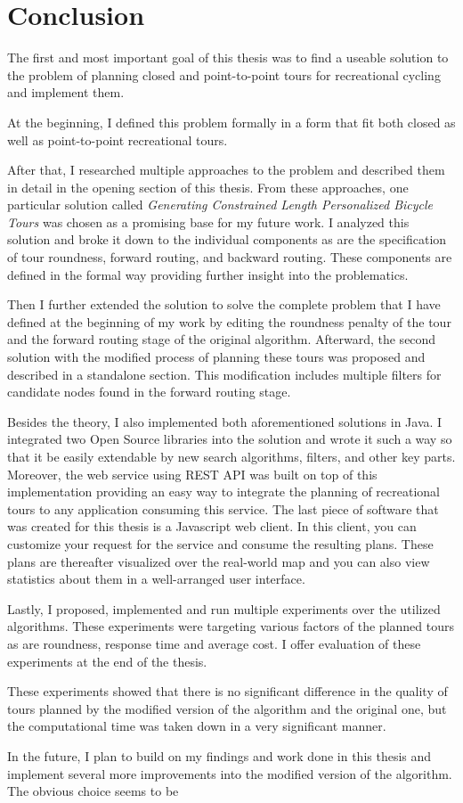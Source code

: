 \documentclass{ctuthesis}
\begin{document}
\chapter{Conclusion}
The first and most important goal of this thesis was to find a useable solution to the problem of planning closed and point-to-point tours for recreational cycling and implement them. \par At the beginning, I defined this problem formally in a form that fit both closed as well as point-to-point recreational tours.\par After that, I researched multiple approaches to the problem and described them in detail in the opening section of this thesis. From these approaches, one particular solution called \emph{Generating Constrained Length Personalized Bicycle Tours}\cite{stroobant} was chosen as a promising base for my future work. I analyzed this solution and broke it down to the individual components as are the specification of tour roundness, forward routing, and backward routing. These components are defined in the formal way providing further insight into the problematics. \par Then I further extended the solution to solve the complete problem that I have defined at the beginning of my work by editing the roundness penalty of the tour and the forward routing stage of the original algorithm. Afterward, the second solution with the modified process of planning these tours was proposed and described in a standalone section. This modification includes multiple filters for candidate nodes found in the forward routing stage.\par Besides the theory, I also implemented both aforementioned solutions in Java. I integrated two Open Source libraries into the solution and wrote it such a way so that it be easily extendable by new search algorithms, filters, and other key parts. Moreover, the web service using REST API\cite{rest} was built on top of this implementation providing an easy way to integrate the planning of recreational tours to any application consuming this service. The last piece of software that was created for this thesis is a Javascript web client. In this client, you can customize your request for the service and consume the resulting plans. These plans are thereafter visualized over the real-world map and you can also view statistics about them in a well-arranged user interface. \par Lastly, I proposed, implemented and run multiple experiments over the utilized algorithms. These experiments were targeting various factors of the planned tours as are roundness, response time and average cost. I offer evaluation of these experiments at the end of the thesis. \par These experiments showed that there is no significant difference in the quality of tours planned by the modified version of the algorithm and the original one, but the computational time was taken down in a very significant manner.\par In the future, I plan to build on my findings and work done in this thesis and implement several more improvements into the modified version of the algorithm. The obvious choice seems to be 
\end{document}
